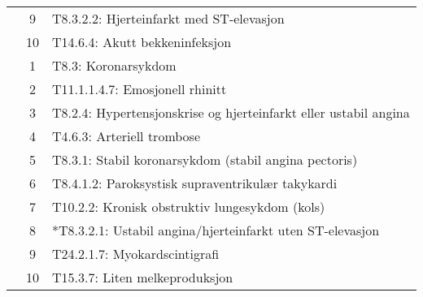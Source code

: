 \documentclass[a4paper, 11pt]{article}
\begin{document}
\begin{table}[htbp]
\begin{tabular}{c c l}
	 & 9 & T8.3.2.2: Hjerteinfarkt med ST-elevasjon \\
	 & 10 & T14.6.4: Akutt bekkeninfeksjon \\
	\addlinespace
	4 & 1 & T8.3: Koronarsykdom \\
	 & 2 & T11.1.1.4.7: Emosjonell rhinitt \\
	 & 3 & T8.2.4: Hypertensjonskrise og hjerteinfarkt eller ustabil angina \\
	 & 4 & T4.6.3: Arteriell trombose \\
	 & 5 & T8.3.1: Stabil koronarsykdom (stabil angina pectoris) \\
	 & 6 & T8.4.1.2: Paroksystisk supraventrikulær takykardi \\
	 & 7 & T10.2.2: Kronisk obstruktiv lungesykdom (kols) \\
	 & 8 & *T8.3.2.1: Ustabil angina/hjerteinfarkt uten ST-elevasjon \\
	 & 9 & T24.2.1.7: Myokardscintigrafi \\
	 & 10 & T15.3.7: Liten melkeproduksjon \\
	\bottomrule
\end{tabular}
\end{table}
\end{document}
